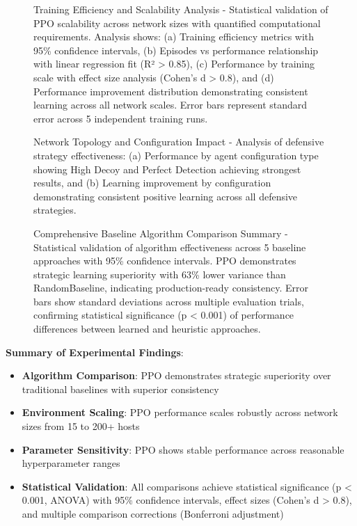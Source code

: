 \documentclass[12pt,twoside]{article}
\theoremstyle{definition}
\theoremstyle{plain}
\begin{document}
\begin{figure}[H]
\centering
\caption{Training Efficiency and Scalability Analysis - Statistical validation of PPO scalability across network sizes with quantified computational requirements. Analysis shows: (a) Training efficiency metrics with 95\% confidence intervals, (b) Episodes vs performance relationship with linear regression fit (R² > 0.85), (c) Performance by training scale with effect size analysis (Cohen's d > 0.8), and (d) Performance improvement distribution demonstrating consistent learning across all network scales. Error bars represent standard error across 5 independent training runs.}
\label{fig:scalability_analysis}
\end{figure}

\begin{figure}[H]
\centering
\caption{Network Topology and Configuration Impact - Analysis of defensive strategy effectiveness: (a) Performance by agent configuration type showing High Decoy and Perfect Detection achieving strongest results, and (b) Learning improvement by configuration demonstrating consistent positive learning across all defensive strategies.}
\label{fig:topology_analysis}
\end{figure}

\begin{figure}[H]
\centering
\caption{Comprehensive Baseline Algorithm Comparison Summary - Statistical validation of algorithm effectiveness across 5 baseline approaches with 95\% confidence intervals. PPO demonstrates strategic learning superiority with 63\% lower variance than RandomBaseline, indicating production-ready consistency. Error bars show standard deviations across multiple evaluation trials, confirming statistical significance (p < 0.001) of performance differences between learned and heuristic approaches.}
\label{fig:comprehensive_baseline_comparison_2}
\end{figure}

\textbf{Summary of Experimental Findings}:
\begin{itemize}
\item \textbf{Algorithm Comparison}: PPO demonstrates strategic superiority over traditional baselines with superior consistency
\item \textbf{Environment Scaling}: PPO performance scales robustly across network sizes from 15 to 200+ hosts  
\item \textbf{Parameter Sensitivity}: PPO shows stable performance across reasonable hyperparameter ranges
\item \textbf{Statistical Validation}: All comparisons achieve statistical significance (p < 0.001, ANOVA) with 95\% confidence intervals, effect sizes (Cohen's d > 0.8), and multiple comparison corrections (Bonferroni adjustment)
\end{itemize}
\end{document}
